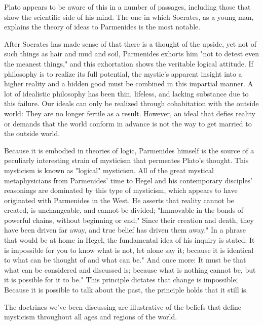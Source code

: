 \documentclass[a4paper,12pt]{book}[2004/02/16]
\theoremstyle{ilemma}
\theoremstyle{itheorem}
\theoremstyle{iother}
\theoremstyle{icorollary}
\theoremstyle{numcorollary}
\theoremstyle{idefinition}
\begin{document}
Plato appears to be aware of this in a number of passages, including those that show the scientific side of his mind. The one in which Socrates, as a young man, explains the theory of ideas to Parmenides is the most notable.

After Socrates has made sense of that there is a thought of the upside, yet
not of such things as hair and mud and soil, Parmenides exhorts him
"not to detest even the meanest things," and this exhortation shows the
veritable logical attitude. If philosophy is to realize its full potential, the mystic's apparent insight into a higher reality and a hidden good must be combined in this impartial manner.
A lot of idealistic philosophy has been thin, lifeless, and lacking substance due to this failure. Our ideals can only be realized through cohabitation with the outside world: They are no longer fertile as a result. However, an ideal that defies reality or demands that the world conform in advance is not the way to get married to the outside world.

Because it is embodied in theories of logic, Parmenides himself is the source of a peculiarly interesting strain of mysticism that permeates Plato's thought. This mysticism is known as "logical" mysticism. All of the great mystical metaphysicians from Parmenides' time to Hegel and his contemporary disciples' reasonings are dominated by this type of mysticism, which appears to have originated with Parmenides in the West. He asserts that reality cannot be created, is unchangeable, and cannot be divided; "Immovable in the bonds of powerful chains, without beginning or end;" Since their creation and death, they have been driven far away, and true belief has driven them away." In a phrase that would be at home in Hegel, the fundamental idea of his inquiry is stated: It is impossible for you to know what is not, let alone say it; because it is identical to what can be thought of and what can be." And once more: It must be that what can be considered and discussed is; because what is nothing cannot be, but it is possible for it to be." This principle dictates that change is impossible; Because it is possible to talk about the past, the principle holds that it still is.

The doctrines we've been discussing are illustrative of the beliefs that define mysticism throughout all ages and regions of the world.
\end{document}
